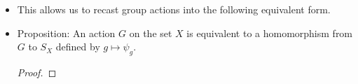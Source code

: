 \documentclass[../notes.tex]{subfiles}
\begin{document}
\begin{itemize}
\begin{proof}
\begin{align*}
            g^{-1}\cdot(g\cdot x) &= g^{-1}\cdot(g\cdot y)\\
            e\cdot x &= e\cdot y\\
            x &= y
        \end{align*}
        Surjectivity: Given $x\in X$, we want $y$ such that $\psi_g(y)=x$. Choose $y=g^{-1}\cdot x$.
    \end{proof}
    \item This allows us to recast group actions into the following equivalent form.
    \item Proposition: An action $G$ on the set $X$ is equivalent to a homomorphism from $G$ to $S_X$ defined by $g\mapsto\psi_g$.
    \begin{proof}



\end{proof}
\end{itemize}
\end{document}

